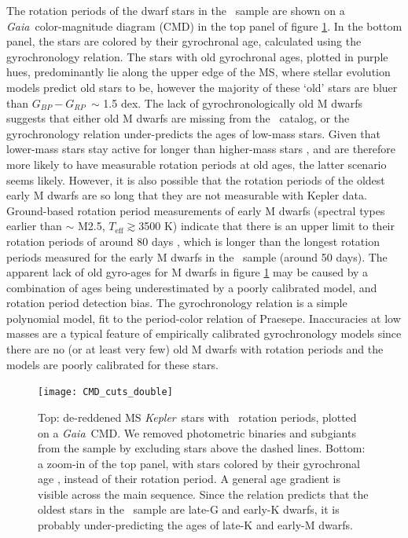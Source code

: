\documentclass{aastex63}
\newcommand{\eg}{{\it e.g.}}
\newcommand{\kepler}{{\it Kepler}}
\newcommand{\gaia}{{\it Gaia}}
\newcommand{\teff}{$T_{\mathrm{eff}}$}
\newcommand{\gcolor}{$G_{BP} - G_{RP}$}
\newcommand{\mct}{\citet{mcquillan2014}}
\newcommand{\racomment}[1]{{\color{blue}#1}}
\begin{document}
The rotation periods of the dwarf stars in the \mct\ sample are shown on a
\gaia\ color-magnitude diagram (CMD) in the top panel of figure
\ref{fig:age_gradient}.
In the bottom panel, the stars are colored by their gyrochronal age,
calculated using the \citet{angus2019} gyrochronology relation.
The stars with old gyrochronal ages, plotted in purple hues, predominantly lie
along the upper edge of the MS, where stellar evolution models predict old
stars to be, however the majority of these `old' stars are bluer than \gcolor\
$\sim$ 1.5 dex.
The lack of gyrochronologically old M dwarfs suggests that either old M dwarfs
are missing from the \mct\ catalog, or the \citet{angus2019} gyrochronology
relation under-predicts the ages of low-mass stars.
Given that lower-mass stars stay active for longer than higher-mass stars
\citep[\eg][]{west2008, newton2017, kiman2019}, and are therefore more likely
to have measurable rotation periods at old ages, the latter scenario seems
likely.
However, it is also possible that the rotation periods of the oldest early M
dwarfs are so long that they are not measurable with Kepler data.
\racomment{Ground-based rotation period measurements of early M dwarfs
(spectral types earlier than $\sim$ M2.5, \teff $\gtrsim$3500 K) indicate that
there is an upper limit to their rotation periods of around 80 days
\citep{newton2016, newton2018}, which is longer than the longest rotation
periods measured for the early M dwarfs in the \mct\ sample (around 50 days).}
The apparent lack of old gyro-ages for M dwarfs in figure
\ref{fig:age_gradient} may be caused by a combination of ages being
underestimated by a poorly calibrated model, and rotation period detection
bias.
The \citet{angus2019} gyrochronology relation is a simple polynomial model,
fit to the period-color relation of Praesepe.
Inaccuracies at low masses are a typical feature of empirically calibrated
gyrochronology models since there are no (or at least very few) old M dwarfs
with rotation periods and the models are poorly calibrated for these stars.
\begin{figure}
  \caption{
      Top: de-reddened MS \kepler\ stars with \mct\ rotation periods, plotted
    on a \gaia\ CMD.
    We removed photometric binaries and subgiants from the sample by excluding
    stars above the dashed lines.
    Bottom: a zoom-in of the top panel, with stars colored by their
    gyrochronal age \citep{angus2019}, instead of their rotation period.
    A general age gradient is visible across the main sequence.
    Since the \citet{angus2019} relation predicts that the oldest stars in
    the \mct\ sample are late-G and early-K dwarfs, it is probably
    under-predicting the ages of late-K and early-M dwarfs.
}
  \centering
    \texttt{[image: CMD\_cuts\_double]}
\label{fig:age_gradient}
\end{figure}
\end{document}
